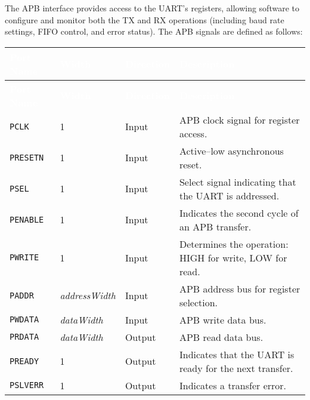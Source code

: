 The APB interface provides access to the UART’s registers, allowing software to configure and monitor both the TX and RX operations (including baud rate settings, FIFO control, and error status). The APB signals are defined as follows:

\renewcommand*{\arraystretch}{1.3}
\begingroup
\small
{}
\begin{longtable}[H]{
  | p{}
  | p{}
  | p{}
  | p{} |
}
\hline
\rowcolor{gray}
\textcolor{white}{\textbf{Port Name}} &
\textcolor{white}{\textbf{Width}} &
\textcolor{white}{\textbf{Direction}} &
\textcolor{white}{\textbf{Description}} \\ \hline
\endfirsthead

\hline
\rowcolor{gray}
\textcolor{white}{\textbf{Port Name}} &
\textcolor{white}{\textbf{Width}} &
\textcolor{white}{\textbf{Direction}} &
\textcolor{white}{\textbf{Description}}\\ \hline
\endhead

\hline
\endfoot

\texttt{PCLK} &
1 &
Input &
APB clock signal for register access. \\ \hline

\texttt{PRESETN} &
1 &
Input &
Active–low asynchronous reset. \\ \hline

\texttt{PSEL} &
1 &
Input &
Select signal indicating that the UART is addressed. \\ \hline

\texttt{PENABLE} &
1 &
Input &
Indicates the second cycle of an APB transfer. \\ \hline

\texttt{PWRITE} &
1 &
Input &
Determines the operation: HIGH for write, LOW for read. \\ \hline

\texttt{PADDR} &
\textit{addressWidth} &
Input &
APB address bus for register selection. \\ \hline

\texttt{PWDATA} &
\textit{dataWidth} &
Input &
APB write data bus. \\ \hline

\texttt{PRDATA} &
\textit{dataWidth} &
Output &
APB read data bus. \\ \hline

\texttt{PREADY} &
1 &
Output &
Indicates that the UART is ready for the next transfer. \\ \hline

\texttt{PSLVERR} &
1 &
Output &
Indicates a transfer error. \\ \hline
\end{longtable}
\label{table:apb_ports}
\endgroup

